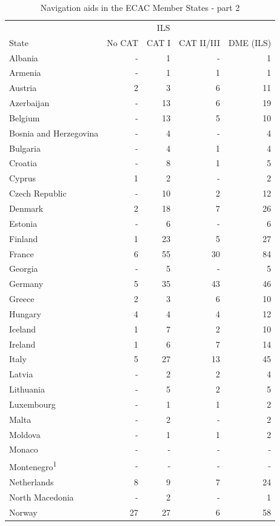 \documentclass[
  11pt,
  a4paper,
]{book}
\begin{document}
\hypertarget{tbl-cns-ecac2}{}
\setlength{\LTpost}{0mm}
\begin{longtable}{lrrrr}
\caption{\label{tbl-cns-ecac2}Navigation aids in the ECAC Member States - part 2 }\tabularnewline

\toprule
 & \multicolumn{3}{c}{ILS} &  \\ 
\cmidrule(lr){2-4}
State & No CAT & CAT I & CAT II/III & DME (ILS) \\ 
\midrule
Albania & - & 1 & - & 1 \\ 
Armenia & - & 1 & 1 & 1 \\ 
Austria & 2 & 3 & 6 & 11 \\ 
Azerbaijan & - & 13 & 6 & 19 \\ 
Belgium & - & 13 & 5 & 10 \\ 
Bosnia and Herzegovina & - & 4 & - & 4 \\ 
Bulgaria & - & 4 & 1 & 4 \\ 
Croatia & - & 8 & 1 & 5 \\ 
Cyprus & 1 & 2 & - & 2 \\ 
Czech Republic & - & 10 & 2 & 12 \\ 
Denmark & 2 & 18 & 7 & 26 \\ 
Estonia & - & 6 & - & 6 \\ 
Finland & 1 & 23 & 5 & 27 \\ 
France & 6 & 55 & 30 & 84 \\ 
Georgia & - & 5 & - & 5 \\ 
Germany & 5 & 35 & 43 & 46 \\ 
Greece & 2 & 3 & 6 & 10 \\ 
Hungary & 4 & 4 & 4 & 12 \\ 
Iceland & 1 & 7 & 2 & 10 \\ 
Ireland & 1 & 6 & 7 & 14 \\ 
Italy & 5 & 27 & 13 & 45 \\ 
Latvia & - & 2 & 2 & 4 \\ 
Lithuania & - & 5 & 2 & 5 \\ 
Luxembourg & - & 1 & 1 & 2 \\ 
Malta & - & 2 & - & 2 \\ 
Moldova & - & 1 & 1 & 2 \\ 
Monaco & - & - & - & - \\ 
Montenegro\textsuperscript{1} & - & - & - & - \\ 
Netherlands & 8 & 9 & 7 & 24 \\ 
North Macedonia & - & 2 & - & 1 \\ 
Norway & 27 & 27 & 6 & 58 \\ 

\end{longtable}
\end{document}
